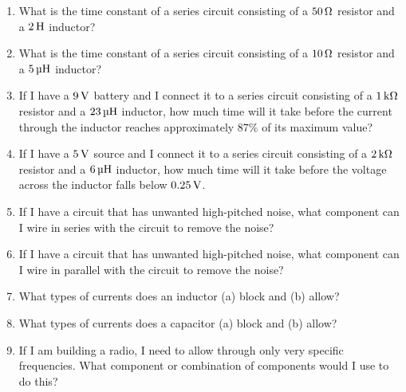 
\begin{enumerate}
\item What is the time constant of a series circuit consisting of a $50\,\si{\ohm}$ resistor and a $2\myhy$ inductor?
\item What is the time constant of a series circuit consisting of a $10\,\si{\ohm}$ resistor and a $5\myuhy$ inductor?
\item If I have a $9\,\si{\volt}$ battery and I connect it to a series circuit consisting of a $1\,\si{\kilo\ohm}$ resistor and a $23\myuhy$ inductor, how much time will it take before the current through the inductor reaches approximately 87\% of its maximum value?
\item If I have a $5\,\si{\volt}$ source and I connect it to a series circuit consisting of a $2\,\si{\kilo\ohm}$ resistor and a $6\myuhy$ inductor, how much time will it take before the voltage across the inductor falls below $0.25\,\si{\volt}$.
\item If I have a circuit that has unwanted high-pitched noise, what component can I wire in series with the circuit to remove the noise?
\item If I have a circuit that has unwanted high-pitched noise, what component can I wire in parallel with the circuit to remove the noise?
\item What types of currents does an inductor (a) block and (b) allow?
\item What types of currents does a capacitor (a) block and (b) allow?
\item If I am building a radio, I need to allow through only very specific frequencies.  What component or combination of components would I use to do this?
\end{enumerate}

